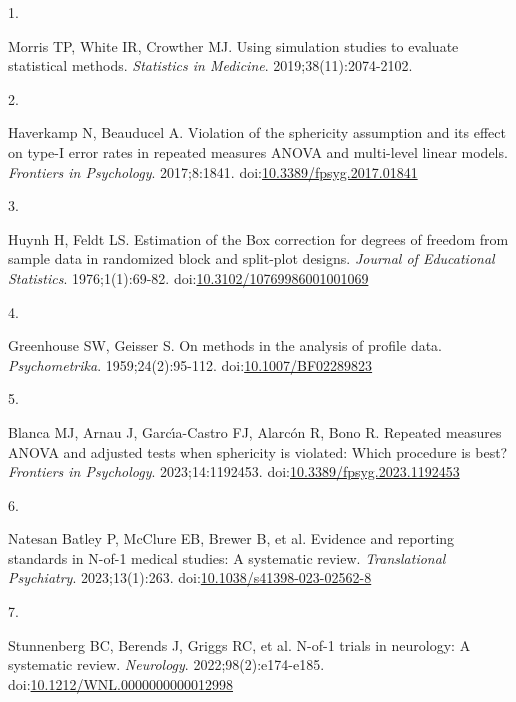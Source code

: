 \documentclass[
  11pt,
]{article}
\newlength{\cslhangindent}
\newlength{\csllabelwidth}
\newenvironment{CSLReferences}[2] %
 {\begin{list}{}{%
  \setlength{\itemindent}{0pt}
  \setlength{\leftmargin}{0pt}
  \setlength{\parsep}{0pt}
  \ifodd #1
   \setlength{\leftmargin}{\cslhangindent}
   \setlength{\itemindent}{-1\cslhangindent}
  \fi
  \setlength{\itemsep}{#2\baselineskip}}}
 {\end{list}}
\newcommand{\CSLLeftMargin}[1]{\parbox[t]{\csllabelwidth}{\strut#1\strut}}
\newcommand{\CSLRightInline}[1]{\parbox[t]{\linewidth - \csllabelwidth}{\strut#1\strut}}
\begin{document}
\protect{}\label{refs}
\begin{CSLReferences}{0}{1}
\CSLLeftMargin{1. }%
\CSLRightInline{Morris TP, White IR, Crowther MJ. Using simulation studies to evaluate statistical methods. \emph{Statistics in Medicine}. 2019;38(11):2074-2102.}

\CSLLeftMargin{2. }%
\CSLRightInline{Haverkamp N, Beauducel A. Violation of the sphericity assumption and its effect on type-{I} error rates in repeated measures {ANOVA} and multi-level linear models. \emph{Frontiers in Psychology}. 2017;8:1841. doi:\href{https://doi.org/10.3389/fpsyg.2017.01841}{10.3389/fpsyg.2017.01841}}

\CSLLeftMargin{3. }%
\CSLRightInline{Huynh H, Feldt LS. Estimation of the {Box} correction for degrees of freedom from sample data in randomized block and split-plot designs. \emph{Journal of Educational Statistics}. 1976;1(1):69-82. doi:\href{https://doi.org/10.3102/10769986001001069}{10.3102/10769986001001069}}

\CSLLeftMargin{4. }%
\CSLRightInline{Greenhouse SW, Geisser S. On methods in the analysis of profile data. \emph{Psychometrika}. 1959;24(2):95-112. doi:\href{https://doi.org/10.1007/BF02289823}{10.1007/BF02289823}}

\CSLLeftMargin{5. }%
\CSLRightInline{Blanca MJ, Arnau J, Garcı́a-Castro FJ, Alarcón R, Bono R. Repeated measures {ANOVA} and adjusted tests when sphericity is violated: Which procedure is best? \emph{Frontiers in Psychology}. 2023;14:1192453. doi:\href{https://doi.org/10.3389/fpsyg.2023.1192453}{10.3389/fpsyg.2023.1192453}}

\CSLLeftMargin{6. }%
\CSLRightInline{Natesan Batley P, McClure EB, Brewer B, et al. Evidence and reporting standards in {N}-of-1 medical studies: A systematic review. \emph{Translational Psychiatry}. 2023;13(1):263. doi:\href{https://doi.org/10.1038/s41398-023-02562-8}{10.1038/s41398-023-02562-8}}

\CSLLeftMargin{7. }%
\CSLRightInline{Stunnenberg BC, Berends J, Griggs RC, et al. {N}-of-1 trials in neurology: A systematic review. \emph{Neurology}. 2022;98(2):e174-e185. doi:\href{https://doi.org/10.1212/WNL.0000000000012998}{10.1212/WNL.0000000000012998}}


\end{CSLReferences}
\end{document}
